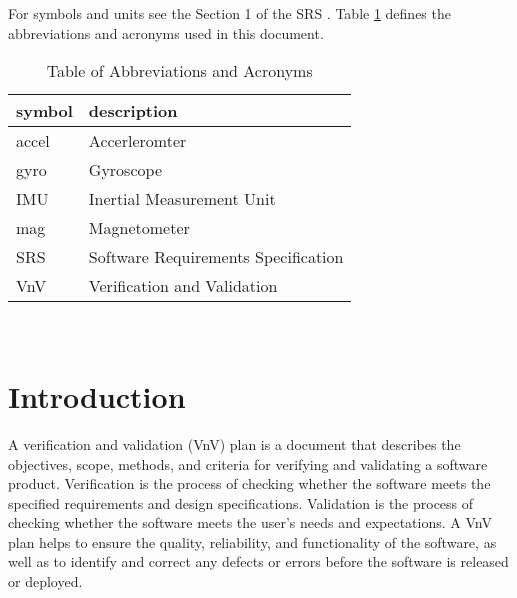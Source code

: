 \documentclass[12pt, titlepage]{article}
\begin{document}
For symbols and units see the Section 1 of the SRS \citep{SRS}. Table \ref{tab:abb} defines the
abbreviations and acronyms used in this document.


\begin{table}[!h]
  \centering
  \caption{Table of Abbreviations and Acronyms}
\renewcommand{\arraystretch}{1.2}
\begin{tabular}{l l} 
    \toprule
    \textbf{symbol} & \textbf{description}\\
    \midrule 
    accel & Accerleromter \\
    gyro & Gyroscope \\
    IMU & Inertial Measurement Unit\\
    mag & Magnetometer \\
    SRS & Software Requirements Specification\\
    VnV & Verification and Validation \\
    \bottomrule
\end{tabular}\\
\label{tab:abb}
\end{table}



\newpage


\section{Introduction}

A verification and validation (VnV) plan is a document that describes the objectives, scope,
methods, and criteria for verifying and validating a software product. Verification is the process
of checking whether the software meets the specified requirements and design specifications.
Validation is the process of checking whether the software meets the user's needs and expectations.
A VnV plan helps to ensure the quality, reliability, and functionality of the software, as well as
to identify and correct any defects or errors before the software is released or deployed.
\end{document}
